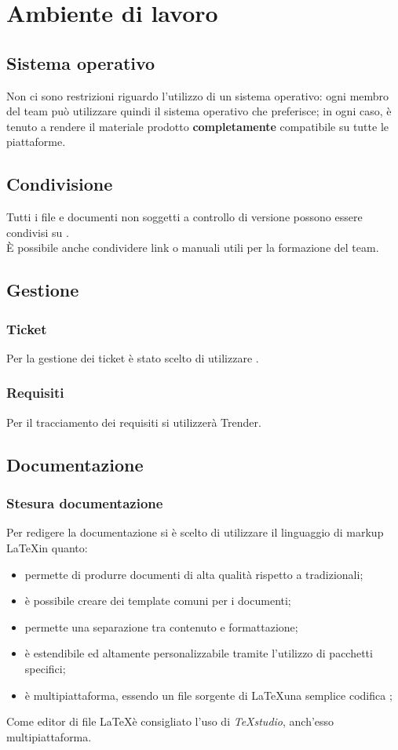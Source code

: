 \section{Ambiente di lavoro}
	\subsection{Sistema operativo}
	Non ci sono restrizioni riguardo l'utilizzo di un sistema operativo: ogni membro del team può utilizzare quindi il sistema operativo che preferisce; in ogni caso, è tenuto a rendere il materiale prodotto \textbf{completamente} compatibile su tutte le piattaforme.
	\subsection{Condivisione}
	Tutti i file e documenti non soggetti a controllo di versione possono essere condivisi su . \\
	È possibile anche condividere link o manuali utili per la formazione del team.
	\subsection{Gestione}
	\subsubsection{Ticket}
	Per la gestione dei ticket è stato scelto di utilizzare . %
	\subsubsection{Requisiti}
	Per il tracciamento dei requisiti si utilizzerà Trender. %
	\subsection{Documentazione}
	\subsubsection{Stesura documentazione}
	Per redigere la documentazione si è scelto di utilizzare il linguaggio di markup \LaTeX in quanto: \\
	\begin{itemize} 
	\item permette di produrre documenti di alta qualità rispetto a  tradizionali; 
	\item è possibile creare dei template comuni per i documenti;
	\item permette una separazione tra contenuto e formattazione;
	\item è estendibile ed altamente personalizzabile tramite l'utilizzo di pacchetti specifici;
	\item è multipiattaforma, essendo un file sorgente di \LaTeX una semplice codifica ;
	\end{itemize}
	Come editor di file \LaTeX è consigliato l'uso di \textit{TeXstudio}, anch'esso multipiattaforma.
